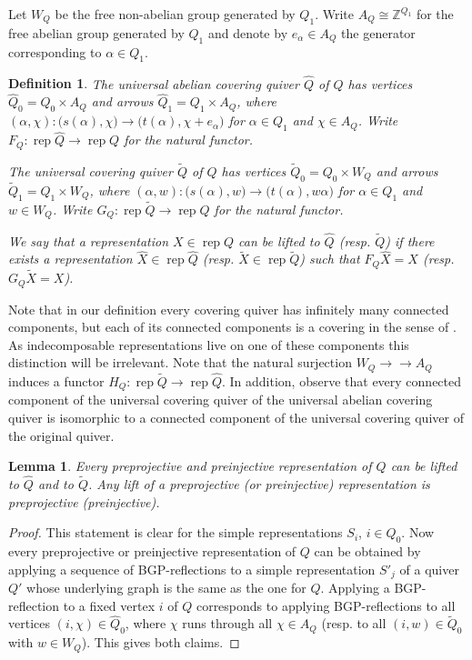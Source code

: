 \documentclass{amsart}
\newcommand{\sayD}[1]{\say[D]{#1}}
\newtheorem{definition}[theorem]{Definition}
\newtheorem{lemma}[theorem]{Lemma}
\numberwithin{equation}{section}
\newcommand{\rep}{\operatorname{rep}}
\newcommand{\ZZ}{\mathbb{Z}}
\newcommand{\onto}{\to\!\!\!\!\!\to}
\begin{document}
Let $W_Q$ be the free non-abelian group generated by $Q_1$.  
Write $A_Q\cong \ZZ^{Q_1}$ for the free abelian group generated by $Q_1$ and denote by $e_\alpha\in A_Q$ the generator corresponding to $\alpha\in Q_1$. 
\begin{definition}
  \label{def:covering quivers}
  The \emph{universal abelian covering quiver} $\hat Q$ of $Q$ has vertices $\hat Q_0=Q_0\times A_Q$ and arrows $\hat Q_1=Q_1\times A_Q$, where $(\alpha,\chi):\big(s(\alpha),\chi\big)\to\big(t(\alpha),\chi+e_\alpha\big)$ for $\alpha\in Q_1$ and $\chi\in A_Q$.
  Write $F_Q:\rep \hat Q\to\rep Q$ for the natural functor. 

  The \emph{universal covering quiver} $\widetilde Q$ of $Q$ has vertices $\widetilde Q_0=Q_0\times W_Q$ and arrows $\widetilde Q_1=Q_1\times W_Q$, where $(\alpha,w):\big(s(\alpha),w\big)\to\big(t(\alpha),w\alpha\big)$ for $\alpha\in Q_1$ and $w\in W_Q$.
  Write $G_Q:\rep\widetilde Q\to\rep Q$ for the natural functor. 

  We say that a representation $X\in\rep Q$ can be \emph{lifted} to $\hat Q$ (resp. $\widetilde Q$) if there exists a representation $\hat X\in\rep \hat Q$ (resp. $\widetilde X\in\rep \widetilde Q$) such that $F_Q\hat X=X$ (resp. $G_Q \widetilde X=X$).
\end{definition}

Note that in our definition every covering quiver has infinitely many connected components, but each of its connected components is a covering in the sense of \cite{gab}.
As indecomposable representations live on one of these components this distinction will be irrelevant.
Note that the natural surjection $W_Q\onto A_Q$ induces a functor $H_Q:\rep \widetilde Q\to\rep \hat Q$.
In addition, observe that every connected component of the universal covering quiver of the universal abelian covering quiver is isomorphic to a connected component of the universal covering quiver of the original quiver.

\begin{lemma}
  \label{le:lifts of transjectives}
  Every preprojective and preinjective representation of $Q$ can be lifted to $\hat Q$ and to $\widetilde Q$. Any lift of a preprojective (or preinjective) representation is preprojective (preinjective). 
\end{lemma}
\begin{proof}
  This statement is clear for the simple representations $S_i$, $i\in Q_0$.
  Now every preprojective or preinjective representation of $Q$ can be obtained by applying a sequence of BGP-reflections \cite{bgp} to a simple representation $S'_j$ of a quiver $Q'$ whose underlying graph is the same as the one for $Q$.
  Applying a BGP-reflection to a fixed vertex $i$ of $Q$ corresponds to applying BGP-reflections to all vertices $(i,\chi)\in\hat Q_0$, where $\chi$ runs through all $\chi\in A_Q$ (resp. to all $(i,w)\in \tilde Q_0$ with $w\in W_Q$).
  This gives both claims.
\end{proof}
\end{document}
